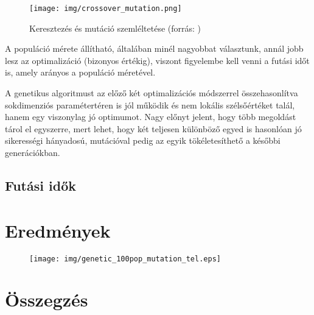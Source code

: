 \documentclass[12pt]{article}
\begin{document}
\begin{figure}[H]
	\centering
	\texttt{[image: img/crossover\_mutation.png]}
	\caption{Keresztezés és mutáció szemléltetése (forrás: \cite{genetic_cross-mutation})}
	\label{}
\end{figure}

A populáció mérete állítható, általában minél nagyobbat választunk, annál jobb lesz az optimalizáció (bizonyos értékig), viszont figyelembe kell venni a futási időt is, amely arányos a populáció méretével.

A genetikus algoritmust az előző két optimalizációs módszerrel összehasonlítva sokdimenziós paramétertéren is jól működik és nem lokális szélsőértéket talál, hanem egy viszonylag jó optimumot. Nagy előnyt jelent, hogy több megoldást tárol el egyszerre, mert lehet, hogy két teljesen különböző egyed is hasonlóan jó sikerességi hányadosú, mutációval pedig az egyik tökéletesíthető a későbbi generációkban.
\subsection{Futási idők}
\section{Eredmények}
\begin{figure}[H]
	\centering
	\texttt{[image: img/genetic\_100pop\_mutation\_tel.eps]}
\end{figure}
\section{Összegzés}

\end{document}
